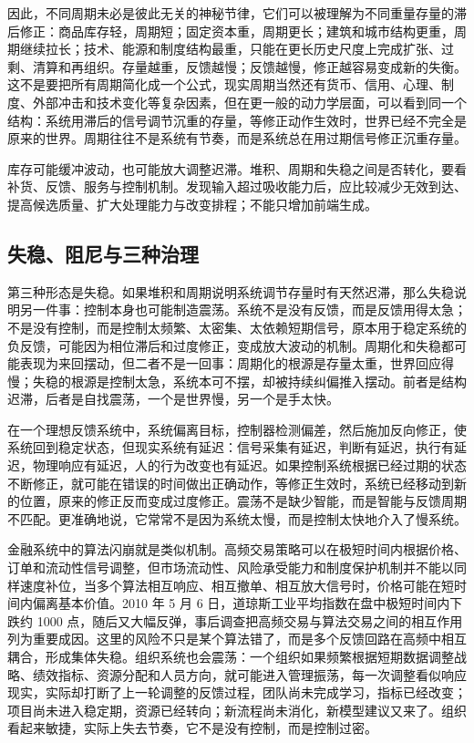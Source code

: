 因此，不同周期未必是彼此无关的神秘节律，它们可以被理解为不同重量存量的滞后修正：商品库存轻，周期短；固定资本重，周期更长；建筑和城市结构更重，周期继续拉长；技术、能源和制度结构最重，只能在更长历史尺度上完成扩张、过剩、清算和再组织。存量越重，反馈越慢；反馈越慢，修正越容易变成新的失衡。这不是要把所有周期简化成一个公式，现实周期当然还有货币、信用、心理、制度、外部冲击和技术变化等复杂因素，但在更一般的动力学层面，可以看到同一个结构：系统用滞后的信号调节沉重的存量，等修正动作生效时，世界已经不完全是原来的世界。周期往往不是系统有节奏，而是系统总在用过期信号修正沉重存量。

库存可能缓冲波动，也可能放大调整迟滞。堆积、周期和失稳之间是否转化，要看补货、反馈、服务与控制机制。发现输入超过吸收能力后，应比较减少无效到达、提高候选质量、扩大处理能力与改变排程；不能只增加前端生成。

\subsection{失稳、阻尼与三种治理}


第三种形态是失稳。如果堆积和周期说明系统调节存量时有天然迟滞，那么失稳说明另一件事：控制本身也可能制造震荡。系统不是没有反馈，而是反馈用得太急；不是没有控制，而是控制太频繁、太密集、太依赖短期信号，原本用于稳定系统的负反馈，可能因为相位滞后和过度修正，变成放大波动的机制。周期化和失稳都可能表现为来回摆动，但二者不是一回事：周期化的根源是存量太重，世界回应得慢；失稳的根源是控制太急，系统本可不摆，却被持续纠偏推入摆动。前者是结构迟滞，后者是自找震荡，一个是世界慢，另一个是手太快。

在一个理想反馈系统中，系统偏离目标，控制器检测偏差，然后施加反向修正，使系统回到稳定状态，但现实系统有延迟：信号采集有延迟，判断有延迟，执行有延迟，物理响应有延迟，人的行为改变也有延迟。如果控制系统根据已经过期的状态不断修正，就可能在错误的时间做出正确动作，等修正生效时，系统已经移动到新的位置，原来的修正反而变成过度修正。震荡不是缺少智能，而是智能与反馈周期不匹配。更准确地说，它常常不是因为系统太慢，而是控制太快地介入了慢系统。

金融系统中的算法闪崩就是类似机制。高频交易策略可以在极短时间内根据价格、订单和流动性信号调整，但市场流动性、风险承受能力和制度保护机制并不能以同样速度补位，当多个算法相互响应、相互撤单、相互放大信号时，价格可能在短时间内偏离基本价值\cite{sec2010findings}。2010 年 5 月 6 日，道琼斯工业平均指数在盘中极短时间内下跌约 1000 点，随后又大幅反弹，事后调查把高频交易与算法交易之间的相互作用列为重要成因。这里的风险不只是某个算法错了，而是多个反馈回路在高频中相互耦合，形成集体失稳。组织系统也会震荡：一个组织如果频繁根据短期数据调整战略、绩效指标、资源分配和人员方向，就可能进入管理振荡，每一次调整看似响应现实，实际却打断了上一轮调整的反馈过程，团队尚未完成学习，指标已经改变；项目尚未进入稳定期，资源已经转向；新流程尚未消化，新模型建议又来了。组织看起来敏捷，实际上失去节奏，它不是没有控制，而是控制过密。

